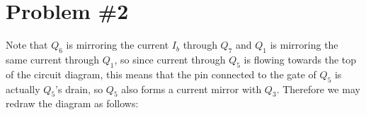 \documentclass{article}
\begin{document}

\section*{Problem \#2}
Note that $Q_6$ is mirroring the current $I_b$ through $Q_7$ and $Q_1$ is
mirroring the same current through $Q_1$, so since current through $Q_5$ is
flowing towards the top of the circuit diagram, this means that the pin 
connected to the gate of $Q_5$ is actually $Q_5$'s drain, so $Q_5$ also forms a
current mirror with $Q_3$. Therefore we may redraw the diagram as follows:
\end{document}
